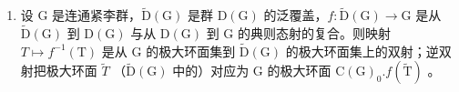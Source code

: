 \begin{enumerate}
\def\labelenumi{\arabic{enumi})}
\setcounter{enumi}{1}
\tightlist
\item
  设 G 是连通紧李群，\(\widetilde{\mathrm{D}}(\mathrm{G})\) 是群 \(\mathrm{D}(\mathrm{G})\) 的泛覆盖，\(f : \widetilde{\mathrm{D}}(\mathrm{G}) \to \mathrm{G}\) 是从 \(\tilde{\mathrm{D}}(\mathrm{G})\) 到 \(\mathrm{D}(\mathrm{G})\) 与从 \(\mathrm{D}(\mathrm{G})\) 到 G 的典则态射的复合。则映射 \(T \mapsto f^{-1}(\mathrm{T})\) 是从 G 的极大环面集到 \(\tilde{\mathrm{D}}(\mathrm{G})\) 的极大环面集上的双射；逆双射把极大环面 \(\tilde{T}\) （\(\tilde{\mathrm{D}}(\mathrm{G})\) 中的）对应为 G 的极大环面 \(\mathrm{C}(\mathrm{G})_{0}.f(\tilde{\mathrm{T}})\) 。
\end{enumerate}

